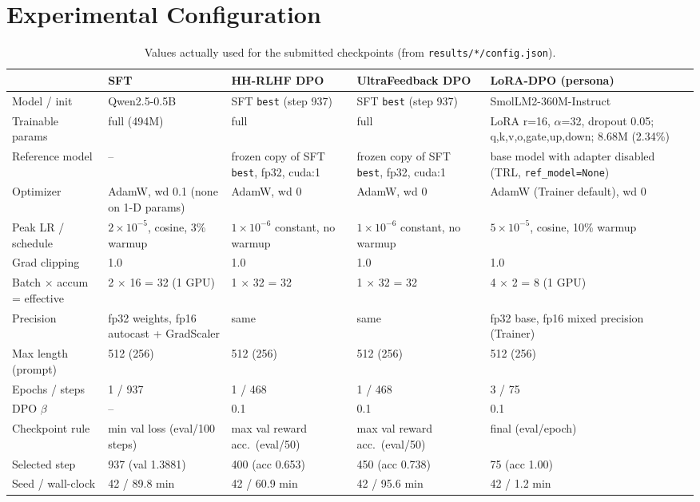 \documentclass[10pt]{article}
\newcommand{\code}[1]{\texttt{\small #1}}
\begin{document}
\section{Experimental Configuration}
\begin{table}[h]
\centering\footnotesize
\setlength{\tabcolsep}{3.5pt}
\caption{Values actually used for the submitted checkpoints (from \code{results/*/config.json}).}
\label{tab:config}
\begin{tabularx}{\linewidth}{@{}l Y Y Y Y@{}}
\toprule
 & SFT & HH-RLHF DPO & UltraFeedback DPO & LoRA-DPO (persona) \\
\midrule
Model / init & Qwen2.5-0.5B & SFT \code{best} (step 937) & SFT \code{best} (step 937) & SmolLM2-360M-Instruct \\
Trainable params & full (494M) & full & full & LoRA r=16, $\alpha$=32, dropout 0.05; q,k,v,o,gate,up,down; 8.68M (2.34\%) \\
Reference model & -- & frozen copy of SFT \code{best}, fp32, cuda:1 & frozen copy of SFT \code{best}, fp32, cuda:1 & base model with adapter disabled (TRL, \code{ref\_model=None}) \\
Optimizer & AdamW, wd 0.1 (none on 1-D params) & AdamW, wd 0 & AdamW, wd 0 & AdamW (Trainer default), wd 0 \\
Peak LR / schedule & $2\!\times\!10^{-5}$, cosine, 3\% warmup & $1\!\times\!10^{-6}$ constant, no warmup & $1\!\times\!10^{-6}$ constant, no warmup & $5\!\times\!10^{-5}$, cosine, 10\% warmup \\
Grad clipping & 1.0 & 1.0 & 1.0 & 1.0 \\
Batch $\times$ accum = effective & 2 $\times$ 16 = 32 (1 GPU) & 1 $\times$ 32 = 32 & 1 $\times$ 32 = 32 & 4 $\times$ 2 = 8 (1 GPU) \\
Precision & fp32 weights, fp16 autocast + GradScaler & same & same & fp32 base, fp16 mixed precision (Trainer) \\
Max length (prompt) & 512 (256) & 512 (256) & 512 (256) & 512 (256) \\
Epochs / steps & 1 / 937 & 1 / 468 & 1 / 468 & 3 / 75 \\
DPO $\beta$ & -- & 0.1 & 0.1 & 0.1 \\
Checkpoint rule & min val loss (eval/100 steps) & max val reward acc.\ (eval/50) & max val reward acc.\ (eval/50) & final (eval/epoch) \\
Selected step & 937 (val 1.3881) & 400 (acc 0.653) & 450 (acc 0.738) & 75 (acc 1.00) \\
Seed / wall-clock & 42 / 89.8 min & 42 / 60.9 min & 42 / 95.6 min & 42 / 1.2 min \\
\bottomrule
\end{tabularx}
\end{table}
\end{document}
